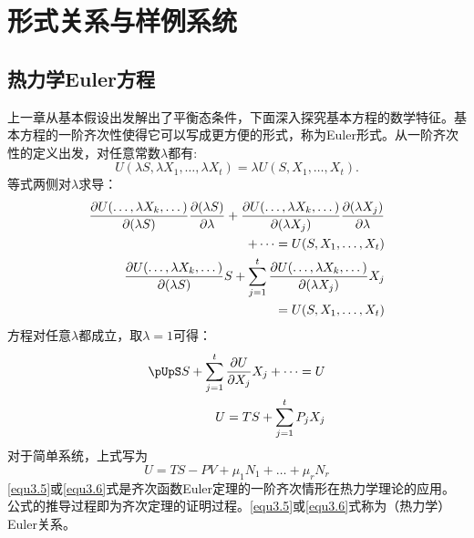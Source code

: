 

\chapter{形式关系与样例系统}
\label{chap3}

\section{热力学Euler方程}
\label{sec3.1}
上一章从基本假设出发解出了平衡态条件，下面深入探究基本方程的数学特征。基本方程的一阶齐次性使得它可以写成更方便的形式，称为Euler形式。从一阶齐次性的定义出发，对任意常数$\lambda$都有:
\begin{equation}
\label{equ3.1}
    U(\lambda S, \lambda X_1, \dots, \lambda X_t) = \lambda U(S, X_1, \dots, X_t).
\end{equation}
等式两侧对$\lambda$求导：
\begin{align}
    \frac{ \partial U(\dots, \lambda X_k, \dots)}{\partial (\lambda S)} \frac{\partial (\lambda S)}{\partial \lambda} + \frac{ \partial U(\dots, \lambda X_k, \dots)}{\partial (\lambda X_j)} \frac{\partial (\lambda X_j)}{\partial \lambda} \notag \\
    + \dots = U(S, X_1, \dots, X_t) \label{equ3.2} \\
    \frac{\partial U(\dots, \lambda X_k, \dots)}{\partial (\lambda S)} S + \sum_{j = 1}^t \frac{\partial U(\dots, \lambda X_k, \dots)}{\partial (\lambda X_j)} X_j \notag \\
    = U(S, X_1, \dots, X_t) \label{equ3.3}
\end{align}
方程对任意$\lambda$都成立，取$\lambda = 1$可得：
\begin{align}
    \pUpS S + \sum_{j = 1}^t \frac{\partial U}{\partial X_j} X_j + \dots = U \label{equ3.4} \\
    U = TS + \sum_{j = 1}^t P_j X_j \label{equ3.5}
\end{align}
对于简单系统，上式写为
\begin{equation}
\label{equ3.6}
    U = TS - PV + \mu_1 N_1 + \dots + \mu_r N_r
\end{equation}
\eqref{equ3.5}或\eqref{equ3.6}式是齐次函数Euler定理的一阶齐次情形在热力学理论的应用。公式的推导过程即为齐次定理的证明过程。\eqref{equ3.5}或\eqref{equ3.6}式称为（热力学）Euler关系。

